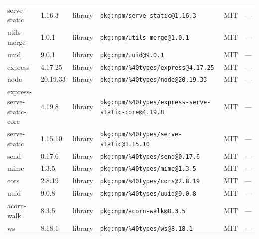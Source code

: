 \documentclass[11pt]{article}
\begin{document}
\begin{longtable}{|l|l|l|p{2.2cm}|l|p{4cm}|}
serve-static & 1.16.3 & library & \texttt{pkg:npm/serve-static@1.16.3} & MIT & — \\
utils-merge & 1.0.1 & library & \texttt{pkg:npm/utils-merge@1.0.1} & MIT & — \\
uuid & 9.0.1 & library & \texttt{pkg:npm/uuid@9.0.1} & MIT & — \\
express & 4.17.25 & library & \texttt{pkg:npm/\%40types/express@4.17.25} & MIT & — \\
node & 20.19.33 & library & \texttt{pkg:npm/\%40types/node@20.19.33} & MIT & — \\
express-serve-static-core & 4.19.8 & library & \texttt{pkg:npm/\%40types/express-serve-static-core@4.19.8} & MIT & — \\
serve-static & 1.15.10 & library & \texttt{pkg:npm/\%40types/serve-static@1.15.10} & MIT & — \\
send & 0.17.6 & library & \texttt{pkg:npm/\%40types/send@0.17.6} & MIT & — \\
mime & 1.3.5 & library & \texttt{pkg:npm/\%40types/mime@1.3.5} & MIT & — \\
cors & 2.8.19 & library & \texttt{pkg:npm/\%40types/cors@2.8.19} & MIT & — \\
uuid & 9.0.8 & library & \texttt{pkg:npm/\%40types/uuid@9.0.8} & MIT & — \\
acorn-walk & 8.3.5 & library & \texttt{pkg:npm/acorn-walk@8.3.5} & MIT & — \\
ws & 8.18.1 & library & \texttt{pkg:npm/\%40types/ws@8.18.1} & MIT & — \\
\hline
\end{longtable}
\end{document}
